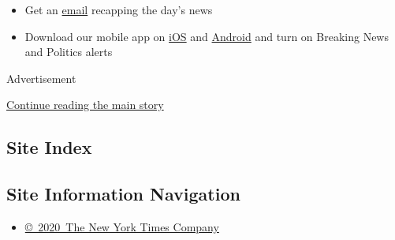 \begin{itemize}
  \begin{itemize}
  \tightlist
  \item
    Get an
    \href{https://www.nytimes3xbfgragh.onion/newsletters/politics?action=click\&pgtype=Article\&state=default\&region=BELOW_MAIN_CONTENT\&context=storylines_guide}{email}
    recapping the day's news
  \end{itemize}

  \begin{itemize}
  \tightlist
  \item
    Download our mobile app on
    \href{https://apps.apple.com/us/app/nytimes/id284862083?ls=1\&mat_click_id=5c79ae7455014fd1bd66b5610c05b8f2-20191112-16948\&referrer=mat_click_id\%3D5c79ae7455014fd1bd66b5610c05b8f2-20191112-16948\%26link_click_id\%3D722930677036718082}{iOS}
    and
    \href{http://a.localytics.com/android?id=com.nytimes.android\&referrer=utm_source\%3Dother_nyt_mobile_web\%26utm_medium\%3DWeb\%2520page\%26utm_term\%3DGeneral\%2520Mobile\%2520Page\%26utm_campaign\%3DNYT\%2520Mobile\%2520General\%2520Page}{Android}
    and turn on Breaking News and Politics alerts
  \end{itemize}
\end{itemize}

Advertisement

\protect\hyperlink{after-bottom}{Continue reading the main story}

\hypertarget{site-index}{%
\subsection{Site Index}\label{site-index}}

\hypertarget{site-information-navigation}{%
\subsection{Site Information
Navigation}\label{site-information-navigation}}

\begin{itemize}
\tightlist
\item
  \href{https://help.nytimes3xbfgragh.onion/hc/en-us/articles/115014792127-Copyright-notice}{©~2020~The
  New York Times Company}
\end{itemize}

